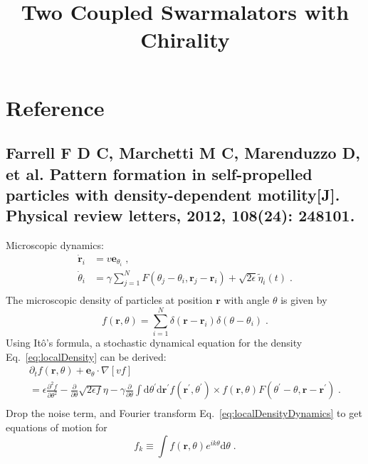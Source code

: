 \documentclass{article}
\title{\textbf{Two Coupled Swarmalators with Chirality}}
\begin{document}
\maketitle

\section{Reference}
\subsection{Farrell F D C, Marchetti M C, Marenduzzo D, et al. Pattern formation in self-propelled particles with density-dependent motility[J]. Physical review letters, 2012, 108(24): 248101.}
Microscopic dynamics:
\begin{equation}
    \label{eq:microscopicEq}
    \begin{aligned}
        \dot{\mathbf{r}}_i&=v\mathbf{e}_{\theta _i}\;,\\
        \dot{\theta}_i&=\gamma \sum_{j=1}^N{F\left( \theta _j-\theta _i,\mathbf{r}_j-\mathbf{r}_i \right)}+\sqrt{2\epsilon}\tilde{\eta}_i\left( t \right)\;.\\
    \end{aligned}
\end{equation}
The microscopic density of particles at position $\mathbf{r}$ with angle $\theta$ is given by
\begin{equation}
    \label{eq:localDensity}
    f \left( \mathbf{r},\theta\right)=\sum_{i=1}^N{\delta \left( \mathbf{r}-\mathbf{r}_i \right)\delta \left( \theta-\theta _i \right)}\;.
\end{equation}
Using It\^{o}'s formula, a stochastic dynamical equation for the density Eq.~\eqref{eq:localDensity} can be derived:
\begin{equation}
    \label{eq:localDensityDynamics}
    \begin{array}{l}
        \partial _tf\left( \mathbf{r},\theta \right) +\mathbf{e}_{\theta}\cdot \nabla \left[ vf \right]\\
        =\epsilon \frac{\partial ^2f}{\partial \theta ^2}-\frac{\partial}{\partial \theta}\sqrt{2\epsilon f}\eta -\gamma \frac{\partial}{\partial \theta}\int{\mathrm{d}\theta ^{\prime}\mathrm{d}\mathbf{r}^{\prime} f\left( \mathbf{r}^{\prime},\theta ^{\prime} \right)}\times f\left( \mathbf{r},\theta \right) F\left( \theta ^{\prime}-\theta ,\mathbf{r}-\mathbf{r}^{\prime} \right)\;.\\
    \end{array}
\end{equation}
Drop the noise term, and Fourier transform Eq.~\eqref{eq:localDensityDynamics} to get equations of motion for
\begin{equation}
    \label{eq:FourierDensity}
    f_k\equiv \int{f\left( \mathbf{r},\theta \right) e^{ik\theta}\mathrm{d}\theta}\;.
\end{equation}
\end{document}
